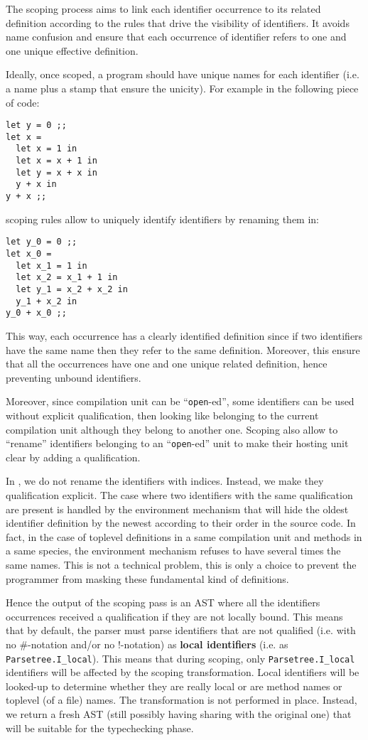 The scoping process aims to link each identifier occurrence to its
related definition according to the rules that drive the visibility of
identifiers. It avoids name confusion and ensure that each occurrence
of identifier refers to one and one unique effective definition.

Ideally, once scoped, a program should have unique names for each
identifier (i.e. a name plus a stamp that ensure the unicity). For
example in the following piece of code:
{\footnotesize
\begin{lstlisting}
let y = 0 ;;
let x =
  let x = 1 in
  let x = x + 1 in
  let y = x + x in
  y + x in
y + x ;;
\end{lstlisting}
}
scoping rules allow to uniquely identify identifiers by renaming them
in:
{\footnotesize
\begin{lstlisting}
let y_0 = 0 ;;
let x_0 =
  let x_1 = 1 in
  let x_2 = x_1 + 1 in
  let y_1 = x_2 + x_2 in
  y_1 + x_2 in
y_0 + x_0 ;;
\end{lstlisting}
}

This way, each occurrence has a clearly identified definition since if
two identifiers have the same name then they refer to the same
definition. Moreover, this ensure that all the occurrences have one
and one unique related definition, hence preventing unbound
identifiers.

Moreover, since compilation unit can be ``{\tt open}-ed'', some
identifiers can be used without explicit qualification, then looking
like belonging to the current compilation unit although they belong to
another one. Scoping also allow to ``rename'' identifiers belonging to
an ``{\tt open}-ed'' unit to make their hosting unit clear by adding a
qualification.

In \focalize, we do not rename the identifiers with indices. Instead,
we make they qualification explicit. The case where two identifiers
with the same qualification are present is handled by the environment
mechanism that will hide the oldest identifier definition by the
newest according to their order in the source code. In fact, in the
case of toplevel definitions in a same compilation unit and methods in
a same species, the environment mechanism refuses to have several
times the same names. This is not a technical problem, this is only a
choice to prevent the programmer from masking these fundamental kind
of definitions.

Hence the output of the scoping pass is an AST where all the
identifiers occurrences received a qualification if they are not
locally bound. This means that by default, the parser must parse
identifiers that are not qualified (i.e. with no \#-notation and/or no
!-notation) as {\bf local identifiers} (i.e. as
{\tt Parsetree.I\_local}). This means that during scoping, only
{\tt Parsetree.I\_local} identifiers will be affected by the scoping
transformation. Local identifiers will be looked-up to determine
whether they are really local or are method names or toplevel (of a
file) names. The transformation is not performed in place. Instead, we
return a fresh AST (still possibly having sharing with the original
one) that will be suitable for the typechecking phase.

